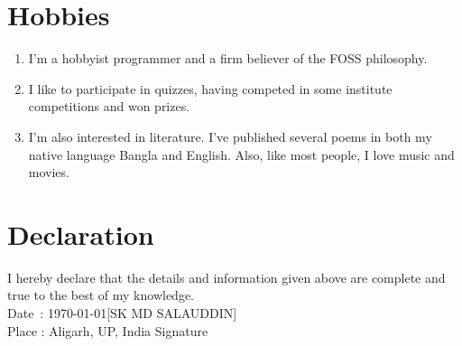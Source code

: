 \documentclass{article}
\begin{document}
	\section{Hobbies}
	\begin{enumerate}[label=(\alph*)]
		\item I'm a hobbyist programmer and a firm believer of the FOSS philosophy.
		\item I like to participate in quizzes, having competed in some institute competitions and won prizes.
		\item I'm also interested in literature. I've published several poems in both my native language Bangla and English. Also, like most
		people, I love music and movies.
	\end{enumerate}
	
	\section{Declaration}
	I hereby declare that the details and information given above are complete and true to the best of my knowledge.
	\vspace*{2cm} \\
	Date \,: \today \hfill [SK MD SALAUDDIN] \\
	Place  : Aligarh, UP, India \hfill Signature \hspace{1cm}
\end{document}
